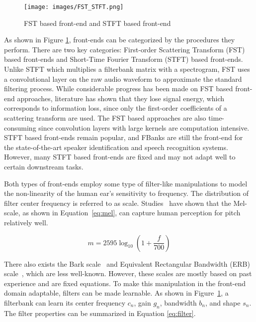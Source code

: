\documentclass[conference]{IEEEtran}
\begin{document}
\begin{figure}[hpbt]
\centering
\texttt{[image: images/FST\_STFT.png]}
\caption{FST based front-end and STFT based front-end}
\label{fig:fst_stft}
\end{figure}

As shown in Figure \ref{fig:fst_stft}, front-ends can be categorized by the procedures they perform. There are two key categories: First-order Scattering Transform (FST)\cite{Andn2014DeepSS} based front-ends and Short-Time Fourier Transform (STFT) based front-ends. Unlike STFT which multiplies a filterbank matrix with a spectrogram,  FST uses a convolutional layer on the raw audio waveform to approximate the standard filtering process. While considerable progress has been made on FST based front-end approaches, literature has shown that they lose signal energy, which corresponds to information loss, since only the first-order coefficients of a scattering transform are used\cite{Andn2014DeepSS}. The FST based approaches are also time-consuming\cite{Lee2018SampleCNNED} since convolution layers with large kernels are computation intensive. STFT based front-ends remain popular, and FBanks are still the front-end for the state-of-the-art speaker identification\cite{Desplanques2020ECAPATDNNEC} and speech recognition\cite{Villalba2020StateoftheartSR} systems. However, many STFT based front-ends are fixed and may not adapt well to certain downstream tasks.

Both types of front-ends employ some type of filter-like manipulations to model the non-linearity of the human ear's sensitivity to frequency. The distribution of filter center frequency is referred to as scale. Studies~\cite{Lippmann1997SpeechRB} have shown that the Mel-scale, as shown in Equation~\ref{eq:mel}, can capture human perception for pitch relatively well. 

\begin{equation}
m=2595 \log _{10}\left(1+\frac{f}{700}\right) \label{eq:mel}
\end{equation}

There also exists the Bark scale~\cite{Zwicker1980AnalyticalEF} and Equivalent Rectangular Bandwidth (ERB) scale~\cite{Glasberg1990DerivationOA}, which are less well-known. However, these scales are mostly based on past experience and are fixed equations. To make this manipulation in the front-end domain adaptable, filters can be made learnable. As shown in Figure~\ref{fig:fst_stft}, a filterbank can learn its center frequency $c_n$, gain $g_n$, bandwidth $b_n$, and shape $s_n$. The filter properties can be summarized in Equation \ref{eq:filter}.
\end{document}
